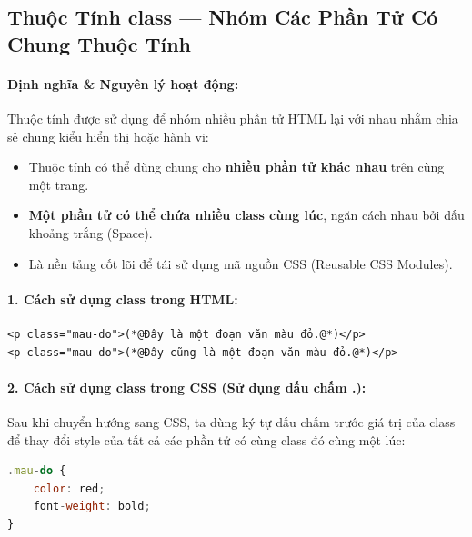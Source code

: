 \subsection{Thuộc Tính class --- Nhóm Các Phần Tử Có Chung Thuộc Tính}

\paragraph{Định nghĩa \& Nguyên lý hoạt động:}
Thuộc tính  được sử dụng để nhóm nhiều phần tử HTML lại với nhau nhằm chia sẻ chung kiểu hiển thị hoặc hành vi:
\begin{itemize}[leftmargin=1.8em, itemsep=3pt, parsep=0pt]
    \item Thuộc tính  có thể dùng chung cho \textbf{nhiều phần tử khác nhau} trên cùng một trang.
    \item \textbf{Một phần tử có thể chứa nhiều class cùng lúc}, ngăn cách nhau bởi dấu khoảng trắng (Space).
    \item Là nền tảng cốt lõi để tái sử dụng mã nguồn CSS (Reusable CSS Modules).
\end{itemize}

\paragraph{1. Cách sử dụng class trong HTML:}
\begin{codeWindow}
\begin{lstlisting}[language=HTML5]
<p class="mau-do">(*@Đây là một đoạn văn màu đỏ.@*)</p>
<p class="mau-do">(*@Đây cũng là một đoạn văn màu đỏ.@*)</p>
\end{lstlisting}
\end{codeWindow}

\paragraph{2. Cách sử dụng class trong CSS (Sử dụng dấu chấm .):}
Sau khi chuyển hướng sang CSS, ta dùng ký tự dấu chấm  trước giá trị của class để thay đổi style của tất cả các phần tử có cùng class đó cùng một lúc:
\begin{codeWindow}
\begin{lstlisting}[language=JavaScript]
.mau-do {
    color: red;
    font-weight: bold;
}
\end{lstlisting}
\end{codeWindow}

